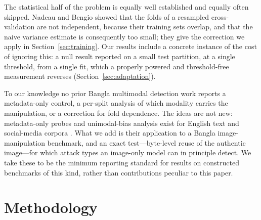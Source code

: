 \documentclass[pdflatex,sn-mathphys-num]{sn-jnl}
\begin{document}
The statistical half of the problem is equally well established and equally
often skipped. Nadeau and Bengio \cite{nadeau} showed that the folds of a
resampled cross-validation are not independent, because their training sets
overlap, and that the naive variance estimate is consequently too small; they
give the correction we apply in Section~\ref{sec:training}. Our results include
a concrete instance of the cost of ignoring this: a null result reported on a
small test partition, at a single threshold, from a single fit, which a
properly powered and threshold-free measurement reverses
(Section~\ref{sec:adaptation}).

To our knowledge no prior Bangla multimodal detection work reports a
metadata-only control, a per-split analysis of which modality carries the
manipulation, or a correction for fold dependence. The ideas are not new:
metadata-only probes and unimodal-bias analysis exist for English text and
social-media corpora \cite{verma,verite}. What we add is their application to a
Bangla image-manipulation benchmark, and an exact test---byte-level reuse of
the authentic image---for which attack types an image-only model can in
principle detect. We take these to be the minimum reporting standard for
results on constructed benchmarks of this kind, rather than contributions
peculiar to this paper.


%
%
%

\section{Methodology}
\end{document}

